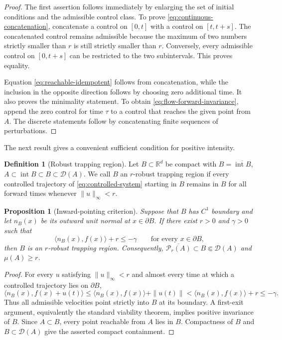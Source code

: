 \documentclass[pdflatex,sn-mathphys-num]{sn-jnl}
\numberwithin{equation}{section}
\theoremstyle{thmstyleone}%
\newtheorem{proposition}[theorem]{Proposition}
\theoremstyle{definition}
\newtheorem{definition}[theorem]{Definition}
\theoremstyle{remark}
\begin{document}
\begin{proof}
The first assertion follows immediately by enlarging the set of initial conditions and the admissible control class. To prove \eqref{eq:continuous-concatenation}, concatenate a control on $[0,t]$ with a control on $[t,t+s]$. The concatenated control remains admissible because the maximum of two numbers strictly smaller than $r$ is still strictly smaller than $r$. Conversely, every admissible control on $[0,t+s]$ can be restricted to the two subintervals. This proves equality.

Equation \eqref{eq:reachable-idempotent} follows from concatenation, while the inclusion in the opposite direction follows by choosing zero additional time. It also proves the minimality statement. To obtain \eqref{eq:flow-forward-invariance}, append the zero control for time $\tau$ to a control that reaches the given point from $A$. The discrete statements follow by concatenating finite sequences of perturbations.
\end{proof}

The next result gives a convenient sufficient condition for positive intensity.

\begin{definition}[Robust trapping region]
\label{def:robust-trapping-region} 
Let $B\subset\mathbb R^d$ be compact with $B=\overline{\operatorname{int}B}$, $A\subset\operatorname{int}B \subset B\subset\mathcal D(A)$. We call $B$ an $r$-robust trapping region if every controlled trajectory of \eqref{eq:controlled-system} starting in $B$ remains in $B$ for all forward times whenever $\|u\|_\infty<r$.
\end{definition}

\begin{proposition}[Inward-pointing criterion]
\label{prop:inward-trapping}
Suppose that $B$ has $C^1$ boundary and let $n_B(x)$ be its outward unit normal at $x\in\partial B$. If there exist $r>0$ and $\gamma>0$ such that
\begin{equation}
\label{eq:inward-condition-ball}
    \langle n_B(x),f(x)\rangle+r
    \leq-\gamma
    \qquad
    \text{for every }x\in\partial B,
\end{equation}
then $B$ is an $r$-robust trapping region. Consequently,
$\overline{\mathcal P_r(A)}
    \subset B\Subset\mathcal D(A)$
and
$\mu(A)\geq r$.
\end{proposition}

\begin{proof}
For every $u$ satisfying $\|u\|_\infty<r$ and almost every time at which a controlled trajectory lies on $\partial B$,
\[
    \langle n_B(x),f(x)+u(t)\rangle\leq
    \langle n_B(x),f(x)\rangle+\|u(t)\|<
    \langle n_B(x),f(x)\rangle+r
    \leq-\gamma.
\]
Thus all admissible velocities point strictly into $B$ at its boundary. A first-exit argument, equivalently the standard viability theorem, implies positive invariance of $B$. Since $A\subset B$, every point reachable from $A$ lies in $B$. Compactness of $B$ and $B\subset\mathcal D(A)$ give the asserted compact containment.
\end{proof}
\end{document}
